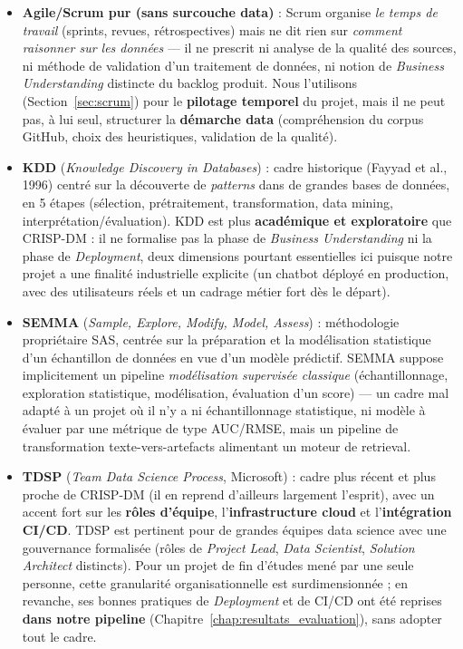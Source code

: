 \documentclass[12pt,a4paper]{report}
\begin{document}
\begin{itemize}
  \item \textbf{Agile/Scrum pur (sans surcouche data)} : Scrum organise \textit{le temps de travail} (sprints, revues, rétrospectives) mais ne dit rien sur \textit{comment raisonner sur les données} --- il ne prescrit ni analyse de la qualité des sources, ni méthode de validation d'un traitement de données, ni notion de \textit{Business Understanding} distincte du backlog produit. Nous l'utilisons (Section~\ref{sec:scrum}) pour le \textbf{pilotage temporel} du projet, mais il ne peut pas, à lui seul, structurer la \textbf{démarche data} (compréhension du corpus GitHub, choix des heuristiques, validation de la qualité).

  \item \textbf{KDD} (\textit{Knowledge Discovery in Databases}) : cadre historique (Fayyad et al., 1996) centré sur la découverte de \textit{patterns} dans de grandes bases de données, en 5 étapes (sélection, prétraitement, transformation, data mining, interprétation/évaluation). KDD est plus \textbf{académique et exploratoire} que CRISP-DM : il ne formalise pas la phase de \textit{Business Understanding} ni la phase de \textit{Deployment}, deux dimensions pourtant essentielles ici puisque notre projet a une finalité industrielle explicite (un chatbot déployé en production, avec des utilisateurs réels et un cadrage métier fort dès le départ).

  \item \textbf{SEMMA} (\textit{Sample, Explore, Modify, Model, Assess}) : méthodologie propriétaire SAS, centrée sur la préparation et la modélisation statistique d'un échantillon de données en vue d'un modèle prédictif. SEMMA suppose implicitement un pipeline \textit{modélisation supervisée classique} (échantillonnage, exploration statistique, modélisation, évaluation d'un score) --- un cadre mal adapté à un projet où il n'y a ni échantillonnage statistique, ni modèle à évaluer par une métrique de type AUC/RMSE, mais un pipeline de transformation texte-vers-artefacts alimentant un moteur de retrieval.

  \item \textbf{TDSP} (\textit{Team Data Science Process}, Microsoft) : cadre plus récent et plus proche de CRISP-DM (il en reprend d'ailleurs largement l'esprit), avec un accent fort sur les \textbf{rôles d'équipe}, l'\textbf{infrastructure cloud} et l'\textbf{intégration CI/CD}. TDSP est pertinent pour de grandes équipes data science avec une gouvernance formalisée (rôles de \textit{Project Lead}, \textit{Data Scientist}, \textit{Solution Architect} distincts). Pour un projet de fin d'études mené par une seule personne, cette granularité organisationnelle est surdimensionnée ; en revanche, ses bonnes pratiques de \textit{Deployment} et de CI/CD ont été reprises \textbf{dans notre pipeline} (Chapitre~\ref{chap:resultats_evaluation}), sans adopter tout le cadre.


\end{itemize}
\end{document}

